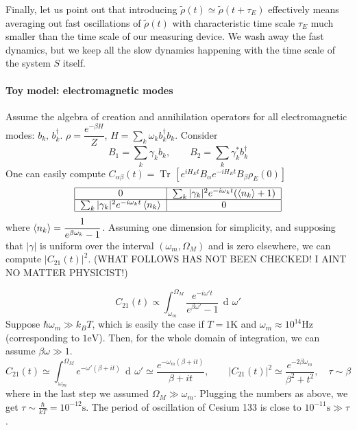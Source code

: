 \documentclass[a4paper, 11pt]{article}
\newcommand{\dd}{\mathop{\mathrm{d}\!}{}}
\newcommand{\Tr}{\mathop{\mathrm{Tr}\!}{}}
\begin{document}
	Finally, let us point out that introducing $\tilde{\rho}(t)\simeq \tilde{\rho}(t+\tau_E)$ effectively means averaging out fast oscillations of $\tilde{\rho}(t)$ with characteristic time scale $\tau_E$ much smaller than the time scale of our measuring device. We wash away the fast dynamics, but we keep all the slow dynamics happening with the time scale of the system $S$ itself.
	
	\paragraph{Toy model: electromagnetic modes} Assume the algebra of creation and annihilation operators for all electromagnetic modes: $b_k,\,b_k^\dagger$. $\rho = \dfrac{e^{-\beta H}}{Z}$, $H = \sum_k \omega_k b_k^\dagger b_k$. Consider
	\[ B_1 = \sum_k \gamma_k b_k,\qquad B_2 = \sum_k \gamma_k^* b_k^\dagger \]
	One can easily compute $C_{\alpha\beta} (t) = \Tr\left[ e^{iH_E t} B_\alpha e^{-iH_Et} B_\beta \rho_E(0) \right]$
	\begin{align*}
	\begin{tabular}{|c|c|}
	\hline 
	0 & $\sum_k |\gamma_k|^2 e^{-i\omega_k t} (\braket{n_k}+1)$ \\ 
	\hline 
	$\sum_k |\gamma_k|^2 e^{-i\omega_k t} \braket{n_k}$ & 0 \\ 
	\hline 
	\end{tabular} 
	\end{align*}
	where $\braket{n_k} = \dfrac{1}{e^{\beta \omega_k} -1 }$. Assuming one dimension for simplicity, and supposing that $|\gamma|$ is uniform over the interval $(\omega_m, \Omega_M)$ and is zero elsewhere, we can compute $|C_{21}(t)|^2$. (WHAT FOLLOWS HAS NOT BEEN CHECKED! I AINT NO MATTER PHYSICIST!)
	
	\[ C_{21}(t) \propto \int_{\omega_m}^{\Omega_M} \dfrac{e^{-i\omega' t}}{e^{\beta \omega'}-1}\,\dd \omega' \]
	Suppose $\hbar \omega_m \gg k_B T$, which is easily the case if $T=1\mathrm{K}$ and $\omega_m \approx 10^{14}\mathrm{Hz}$ (corresponding to $1\mathrm{eV}$). Then, for the whole domain of integration, we can assume $\beta \omega\gg 1$.
	\[ C_{21}(t) \simeq \int_{\omega_m}^{\Omega_M} e^{-\omega' (\beta + it)}\,\dd \omega' \simeq \dfrac{e^{-\omega_m(\beta+it)}}{\beta+it},
	\qquad |C_{21}(t)|^2 \simeq \dfrac{e^{-2\beta \omega_m}}{\beta^2 + t^2},\quad \tau \sim \beta \]
	where in the last step we assumed $\Omega_M \gg \omega_m$. Plugging the numbers as above, we get $\tau \sim \frac{\hbar}{kT} = 10^{-12}\mathrm{s}$. The period of oscillation of Cesium 133 is close to $10^{-11}\mathrm{s}\gg \tau$.
	
\end{document}
